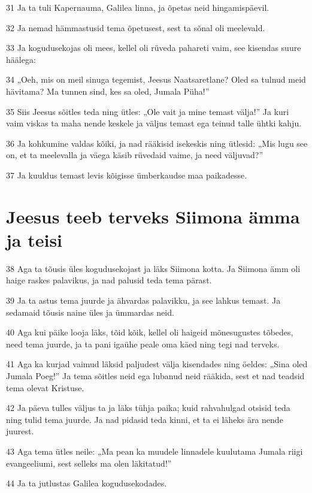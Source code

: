 \par 31 Ja ta tuli Kapernauma, Galilea linna, ja õpetas neid hingamispäevil.
\par 32 Ja nemad hämmastusid tema õpetusest, sest ta sõnal oli meelevald.
\par 33 Ja kogudusekojas oli mees, kellel oli rüveda pahareti vaim, see kisendas suure häälega:
\par 34 „Oeh, mis on meil sinuga tegemist, Jeesus Naatsaretlane? Oled sa tulnud meid hävitama? Ma tunnen sind, kes sa oled, Jumala Püha!”
\par 35 Siis Jeesus sõitles teda ning ütles: „Ole vait ja mine temast välja!” Ja kuri vaim viskas ta maha nende keskele ja väljus temast ega teinud talle ühtki kahju.
\par 36 Ja kohkumine valdas kõiki, ja nad rääkisid isekeskis ning ütlesid: „Mis lugu see on, et ta meelevalla ja väega käsib rüvedaid vaime, ja need väljuvad?”
\par 37 Ja kuuldus temast levis kõigisse ümberkaudse maa paikadesse.

\section*{Jeesus teeb terveks Siimona ämma ja teisi}

\par 38 Aga ta tõusis üles kogudusekojast ja läks Siimona kotta. Ja Siimona ämm oli haige raskes palavikus, ja nad palusid teda tema pärast.
\par 39 Ja ta astus tema juurde ja ähvardas palavikku, ja see lahkus temast. Ja sedamaid tõusis naine üles ja ümmardas neid.
\par 40 Aga kui päike looja läks, tõid kõik, kellel oli haigeid mõnesugustes tõbedes, need tema juurde, ja ta pani igaühe peale oma käed ning tegi nad terveks.
\par 41 Aga ka kurjad vaimud läksid paljudest välja kisendades ning öeldes: „Sina oled Jumala Poeg!” Ja tema sõitles neid ega lubanud neid rääkida, sest et nad teadsid tema olevat Kristuse.
\par 42 Ja päeva tulles väljus ta ja läks tühja paika; kuid rahvahulgad otsisid teda ning tulid tema juurde. Ja nad pidasid teda kinni, et ta ei läheks ära nende juurest.
\par 43 Aga tema ütles neile: „Ma pean ka muudele linnadele kuulutama Jumala riigi evangeeliumi, sest selleks ma olen läkitatud!”
\par 44 Ja ta jutlustas Galilea kogudusekodades.


